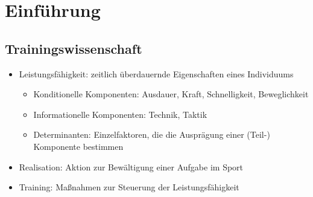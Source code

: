 
\section{Einführung}

\subsection{Trainingswissenschaft}
\begin{itemize}

\item Leistungsfähigkeit: zeitlich überdauernde Eigenschaften eines Individuums
  \begin{itemize}
  \item Konditionelle Komponenten: Ausdauer, Kraft, Schnelligkeit, Beweglichkeit
  \item Informationelle Komponenten: Technik, Taktik
  \item Determinanten: Einzelfaktoren, die die Ausprägung einer (Teil-) Komponente bestimmen
  \end{itemize}
\item Realisation: Aktion zur Bewältigung einer Aufgabe im Sport
\item Training: Maßnahmen zur Steuerung der Leistungsfähigkeit
  \begin{itemize}
    

\end{itemize}
\end{itemize}
